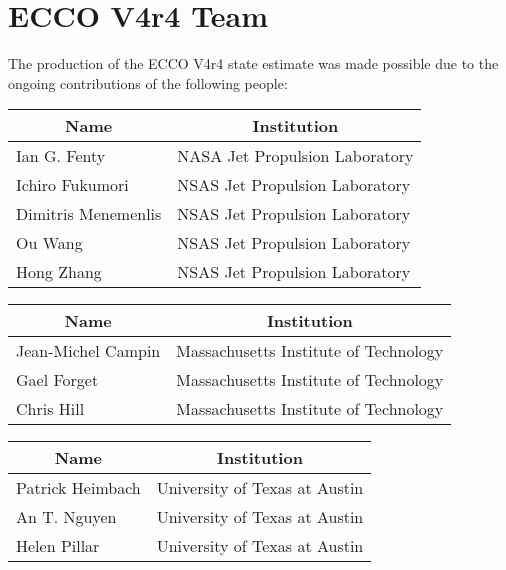 \documentclass[letterpaper]{article}
\begin{document}
\pagebreak
\section{ECCO V4r4 Team}
The production of the ECCO V4r4 state estimate was made possible due to the ongoing contributions of the following people:

\vspace{.5cm}

\vspace{.25cm}
\begin{center}
\begin{tabular}{ m{} m{}}
    \multicolumn{1}{c}{\textbf{Name}} & \multicolumn{1}{c}{\textbf{Institution}} \\ \hline
    Ian G. Fenty & NASA Jet Propulsion Laboratory\\ \hline
    Ichiro Fukumori & NSAS Jet Propulsion Laboratory \\ \hline
    Dimitris Menemenlis & NSAS Jet Propulsion Laboratory\\ \hline
    Ou Wang & NSAS Jet Propulsion Laboratory \\ \hline
    Hong Zhang & NSAS Jet Propulsion Laboratory\\ \hline
\end{tabular}
\end{center}

\vspace{.25cm}

\vspace{.25cm}
\begin{center}
\begin{tabular}{m{} m{} }
    \multicolumn{1}{c}{\textbf{Name}} & \multicolumn{1}{c}{\textbf{Institution}} \\ \hline
    Jean-Michel Campin & Massachusetts Institute of Technology \\ \hline
    Gael Forget & Massachusetts Institute of Technology \\ \hline
    Chris Hill & Massachusetts Institute of Technology \\ \hline
\end{tabular}
\end{center}

\vspace{.25cm}

\vspace{.25cm}
\begin{center}
\begin{tabular}{m{} m{} }
    \multicolumn{1}{c}{\textbf{Name}} & \multicolumn{1}{c}{\textbf{Institution}} \\ \hline
    Patrick Heimbach & University of Texas at Austin \\ \hline
    An T. Nguyen & University of Texas at Austin \\ \hline
    Helen Pillar & University of Texas at Austin \\ \hline
\end{tabular}
\end{center}
\end{document}
